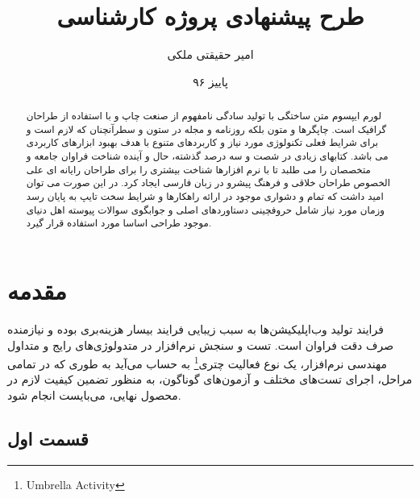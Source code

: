 \documentclass{report}
\title{طرح پیشنهادی پروژه کارشناسی}
\author{امیر حقیقتی ملکی}
\date{پاییز ۹۶}
\theoremstyle{definition}
\begin{document}
	\begin{titlepage}
		
		
	\end{titlepage}
	\newpage
	\begin{abstract}
		\thispagestyle{plain}
		لورم ایپسوم متن ساختگی با تولید سادگی نامفهوم از صنعت چاپ و با استفاده از طراحان گرافیک است. چاپگرها و متون بلکه روزنامه و مجله در ستون و سطرآنچنان که لازم است و برای شرایط فعلی تکنولوژی مورد نیاز و کاربردهای متنوع با هدف بهبود ابزارهای کاربردی می باشد. کتابهای زیادی در شصت و سه درصد گذشته، حال و آینده شناخت فراوان جامعه و متخصصان را می طلبد تا با نرم افزارها شناخت بیشتری را برای طراحان رایانه ای علی الخصوص طراحان خلاقی و فرهنگ پیشرو در زبان فارسی ایجاد کرد. در این صورت می توان امید داشت که تمام و دشواری موجود در ارائه راهکارها و شرایط سخت تایپ به پایان رسد وزمان مورد نیاز شامل حروفچینی دستاوردهای اصلی و جوابگوی سوالات پیوسته اهل دنیای موجود طراحی اساسا مورد استفاده قرار گیرد.
	\end{abstract}
	\newpage
	\tableofcontents
	\newpage
	\chapter{مقدمه}
	فرایند تولید وب‌اپلیکیشن‌ها به سبب زیبایی فرایند بیسار هزینه‌بری بوده و نیازمنده صرف دقت فراوان است. تست و سنجش نرم‌افزار در متدولوژی‌های رایج و متداول مهندسی نرم‌افزار، یک نوع فعالیت چتری\footnote{Umbrella Activity} به حساب می‌آید به طوری که در تمامی مراحل، اجرای تست‌های مختلف و آزمون‌های گوناگون، به منظور تضمین کیفیت لازم در محصول نهایی، می‌بایست انجام شود.
	\section{قسمت اول}
	
\end{document}
